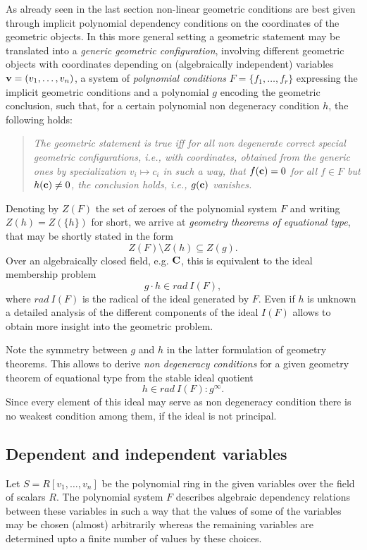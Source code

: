\documentclass{article}
\newcommand{\vau}{{\bf v}}
\begin{document}
As already seen in the last section non-linear geometric conditions
are best given through implicit polynomial dependency conditions on
the coordinates of the geometric objects. In this more general setting
a geometric statement may be translated into a {\em generic geometric
configuration}, involving different geometric objects with coordinates
depending on (algebraically independent) variables $\vau = (v_1,
\ldots, v_n)$, a system of {\em polynomial conditions} $F= \{f_1,
\ldots, f_r\}$ expressing the implicit geometric conditions and a
polynomial $g$ encoding the geometric conclusion, such that, for a
certain polynomial non degeneracy condition $h$, the following holds:
\begin{quote}\it
The geometric statement is true iff for all non degenerate correct
special geometric configurations, i.e., with coordinates, obtained
from the generic ones by specialization $v_i\mapsto c_i$ in such a
way, that $f({\bf c})=0$ for all $f\in F$ but $h({\bf c})\neq 0$, the
conclusion holds, i.e., $g({\bf c})$ vanishes.
\end{quote}
Denoting by $Z(F)$ the set of zeroes of the polynomial system $F$ and
writing $Z(h)=Z(\{h\})$ for short, we arrive at {\em geometry theorems
of equational type}, that may be shortly stated in the form
\[Z(F)\setminus Z(h) \subseteq Z(g).\]
Over an algebraically closed field, e.g. ${\bf C}$, this is equivalent
to the ideal membership problem
\[g\cdot h\in rad\ I(F),\]
where $rad\ I(F)$ is the radical of the ideal generated by $F$. Even
if $h$ is unknown a detailed analysis of the different components of
the ideal $I(F)$ allows to obtain more insight into the geometric
problem.
\medskip

Note the symmetry between $g$ and $h$ in the latter formulation of
geometry theorems. This allows to derive {\em non degeneracy
conditions} for a given geometry theorem of equational type from the
stable ideal quotient
\[h\in rad\ I(F):g^\infty.\]
Since every element of this ideal may serve as non degeneracy
condition there is no weakest condition among them, if the ideal is
not principal.

\subsection{Dependent and independent variables}

Let $S=R[v_1,\ldots,v_n]$ be the polynomial ring in the given
variables over the field of scalars $R$. The polynomial system $F$
describes algebraic dependency relations between these variables in
such a way that the values of some of the variables may be chosen
(almost) arbitrarily whereas the remaining variables are determined
upto a finite number of values by these choices.
\medskip
\end{document}
